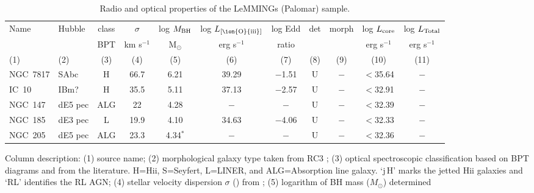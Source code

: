 \begin{table*}
	\centering
		\caption{Radio and optical properties of the LeMMINGs (Palomar) sample.}
	\label{tab1}
	\begin{tabular}{lC{2.5cm}ccccccccc}
	\hline	
\hline
Name & Hubble    & class  & $\sigma$   & log $M_{\rm BH}$ & log $L_{\rm [\ion{O}{iii}]}$ &  log Edd  &  det & morph &  log $L_{\rm core}$  & log $L_{\rm Total}$  \\
           &              &  BPT      &    km s$^{-1}$ &  M$_{\odot}$  & erg s$^{-1}$  & ratio &    &         &  erg s$^{-1}$ & erg s$^{-1}$\\     
(1)       & (2)         & (3)       & (4)             & (5)               & (6)                 & (7)       & (8)   &  (9)          &  (10)           &  (11)  \\
\hline
NGC~7817 & SAbc    & H          &66.7  & 6.21  &  39.29 & $-$1.51  &  U & $-$  & $<$35.64 & $-$ \\
IC~10 	  & IBm?      & H        &35.5  & 5.11  &   37.13 & $-$2.57 & U  & $-$  & $<$32.91 & $-$  \\
NGC~147   &  dE5 pec & ALG   &  22    & 4.28  &  $-$    &  $-$       &  U  & $-$     &  $<$32.39  & $-$ \\
NGC~185   & dE3 pec  &  L       &  19.9  & 4.10  & 34.63 &  $-$4.06 & U & $-$  &  $<$32.33 & $-$   \\
NGC~205   &  dE5 pec  & ALG  & 23.3    & 4.34$^{*}$ &  $-$    &  $-$  &U & $-$  &  $<$32.36 & $-$  \\
\hline
\end{tabular}
\begin{flushleft} Column description: (1) source name; (2)   morphological galaxy type taken from RC3
\citep{devaucouleurs91}; (3) optical spectroscopic classification based on BPT diagrams
and from the literature. H=H{\sc ii}, S=Seyfert, L=LINER, and ALG=Absorption line galaxy. `j\,H' marks the jetted H{\sc ii} galaxies and `RL' identifies the RL AGN; (4) stellar velocity dispersion $\sigma$ (\kms) from
\citet{ho09}; (5) logarithm of BH mass ($M_{\odot}$) determined

\end{flushleft}
\end{table*}

